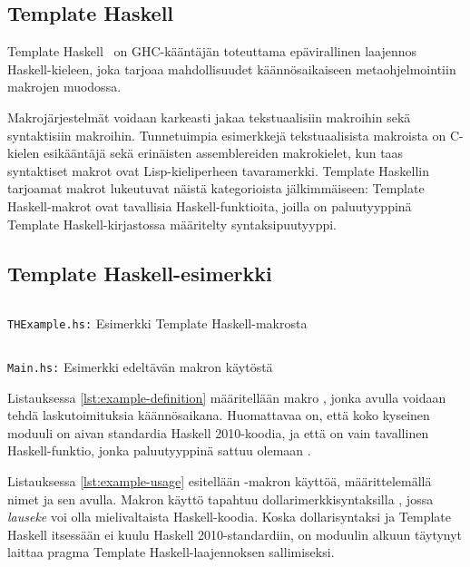 \subsection{Template Haskell}

Template Haskell~\cite{ThPaper} on GHC-kääntäjän toteuttama epävirallinen laajennos Haskell-kieleen,
joka tarjoaa mahdollisuudet käännösaikaiseen metaohjelmointiin makrojen muodossa.

Makrojärjestelmät voidaan karkeasti jakaa tekstuaalisiin makroihin sekä syntaktisiin makroihin.
Tunnetuimpia esimerkkejä tekstuaalisista makroista on C-kielen esikääntäjä sekä erinäisten assemblereiden makrokielet,
kun taas syntaktiset makrot ovat Lisp-kieliperheen tavaramerkki.
Template Haskellin tarjoamat makrot lukeutuvat näistä kategorioista jälkimmäiseen:
Template Haskell-makrot ovat tavallisia Haskell-funktioita,
joilla on paluutyyppinä Template Haskell-kirjastossa määritelty syntaksipuutyyppi.

\subsection{Template Haskell-esimerkki}

\begin{listing}[H]
    \inputminted{haskell}{codes/compile-time-eval-example/THExample.hs}
    \label{lst:example-definition}
    \caption{\texttt{THExample.hs:} Esimerkki Template Haskell-makrosta}
\end{listing}

\begin{listing}[H]
    \inputminted{haskell}{codes/compile-time-eval-example/Main.hs}
    \label{lst:example-usage}
    \caption{\texttt{Main.hs:} Esimerkki edeltävän makron käytöstä}
\end{listing}

Listauksessa \ref{lst:example-definition} määritellään makro ,
jonka avulla voidaan tehdä laskutoimituksia käännösaikana.
Huomattavaa on, että koko kyseinen moduuli on aivan standardia Haskell 2010-koodia,
ja että  on vain tavallinen Haskell-funktio,
jonka paluutyyppinä sattuu olemaan .

Listauksessa \ref{lst:example-usage} esitellään -makron käyttöä,
määrittelemällä nimet  ja  sen avulla.
Makron käyttö tapahtuu dollarimerkkisyntaksilla ,
jossa \emph{lauseke} voi olla mielivaltaista Haskell-koodia.
Koska dollarisyntaksi ja Template Haskell itsessään ei kuulu Haskell 2010-standardiin,
on moduulin alkuun täytynyt laittaa pragma 
Template Haskell-laajennoksen sallimiseksi.

